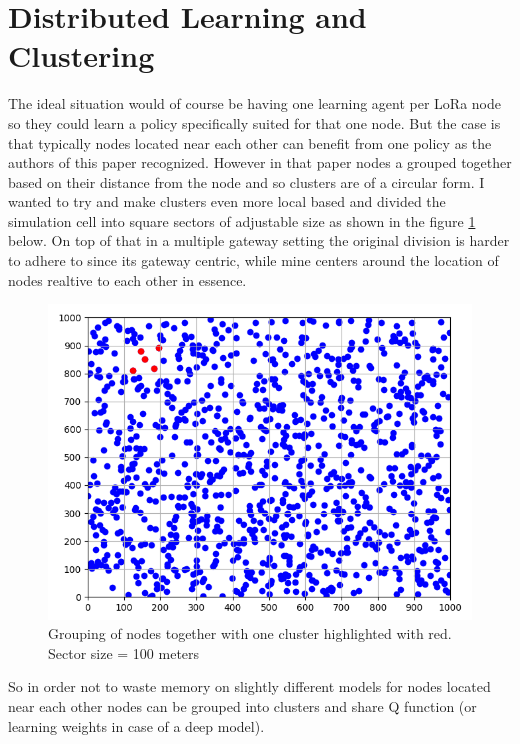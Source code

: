 \section{Distributed Learning and Clustering}
The ideal situation would of course be having one learning agent
per LoRa node so they could learn a policy specifically suited for that one node. But the case is that typically nodes located 
near each other can benefit from one policy as the authors of this paper \cite{rl_lora_original} recognized. However 
in that paper nodes a grouped together based on their 
distance from the node and so clusters are of a circular 
form. 
I wanted to try and make clusters even more local based and divided the simulation cell into 
square sectors of adjustable size as shown in the figure \ref{fig:my_sectors} below. On top of that in a multiple
gateway setting the original division is harder to 
adhere to since its gateway centric, while mine centers
around the location of nodes realtive to each other in
essence. 

\begin{figure}[H]
\centering
\includegraphics[scale=0.7]{figures/my_sectors.PNG}
  \caption{Grouping of nodes together with one cluster highlighted with red. \\ Sector size = 100 meters}
  \label{fig:my_sectors}
\end{figure}

So in order not to waste memory on slightly different models for nodes located near each other nodes can be grouped into clusters and share Q function (or learning weights
in case of a deep model). \\

